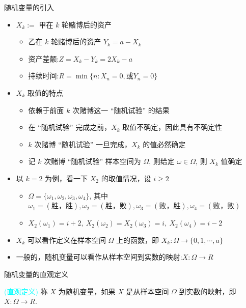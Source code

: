 \documentclass[Prob-All.tex]{subfiles}
\begin{document}
\begin{frame}{随机变量的引入}
	\begin{itemize}[<+-|alert@+>]
		\item $X_k:=$ 甲在 $k$ 轮赌博后的资产
		      \begin{itemize}[<+-|alert@+>]
			      \item 乙在 $k$ 轮赌博后的资产 $Y_k=a-X_k$
			      \item 资产差额:$Z=X_k-Y_k=2X_k-a$
			      \item 持续时间:$R=\min\{n: X_n=0, \mbox{或} Y_n=0\}$
		      \end{itemize}
		\item $X_k$ 取值的特点
		      \begin{itemize}[<+-|alert@+>]
			      \item 依赖于前面 $k$ 次赌博这一 “随机试验” 的结果
			      \item 在 “随机试验” 完成之前，$X_k$ 取值不确定，因此具有不确定性
			      \item $k$ 次赌博 “随机试验” 一旦完成，$X_k$ 的值必然确定
			      \item 记 $k$ 次赌博 “随机试验” 样本空间为 $\Omega$, 则给定 $\omega\in\Omega$, 则 $X_k$ 值确定
		      \end{itemize}
		\item 以 $k=2$ 为例，看一下 $X_2$ 的取值情况，设 $i\geq 2$
		      \begin{itemize}[<+-|alert@+>]
			      \item $\Omega=\{\omega_1,\omega_2, \omega_3,\omega_4\}$, 其中 $\omega_1=(\mbox{胜，胜}), \omega_2=(\mbox{胜，败}), \omega_3=(\mbox{败，胜}), \omega_4=(\mbox{败，败})$
			      \item $X_2(\omega_1)=i+2,\  X_2(\omega_2)=X_2(\omega_3)=i,\  X_2(\omega_4)=i-2$
		      \end{itemize}
		\item $X_k$ 可以看作定义在样本空间 $\Omega$ 上的函数，即 $X_k:\Omega\rightarrow \{0, 1,\cdots, a\}$
		\item 一般的，随机变量可以看作从样本空间到实数的映射:$X:\Omega\rightarrow R$

	\end{itemize}

\end{frame}
\begin{frame}{随机变量的直观定义}
	\begin{defi} \textcolor{cyan}{(直观定义)}
		称 $X$ 为随机变量，如果 $X$ 是从样本空间 $\Omega$ 到实数的映射，即 $X:\Omega\rightarrow R$.
	\end{defi}

\end{frame}
\end{document}
